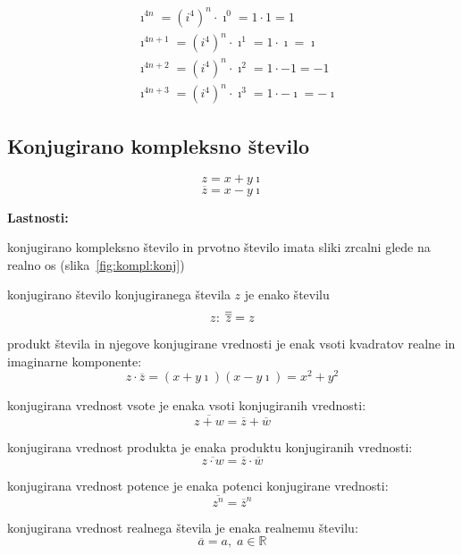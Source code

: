 \documentclass[a4paper,oneside,12pt,fleqn]{article}
\def\R{\ensuremath{\mathbb R}}
\newcommand\krat\cdot
\newcommand{\ii}{\ensuremath{\imath}}
\def\konj{\overline} %
\numberwithin{equation}{section}
\newenvironment{itemize*}%
{
\vspace{-12pt}%
\begin{itemize}%
\setlength{\itemsep}{0pt}%
\setlength{\parskip}{2pt}}%
{\end{itemize}}
\begin{document}
\begin{align*}
  &\ii^{4n} = (i^4)^n \krat \ii^0 = 1 \krat 1 = 1 \\
  &\ii^{4n+1} = (i^4)^n \krat \ii^1 = 1 \krat \ii = \ii \\
  &\ii^{4n+2} = (i^4)^n \krat \ii^2 = 1 \krat -1 = -1 \\
  &\ii^{4n+3} = (i^4)^n \krat \ii^3 = 1 \krat -\ii = -\ii
\end{align*}

\subsection{Konjugirano kompleksno število}
\[ z = x+y\ii \]
\[ \konj{z} = x-y\ii \]

\textbf{Lastnosti:}
\begin{itemize*}
  \item konjugirano kompleksno število in prvotno število imata sliki zrcalni glede na
    realno os (slika~\ref{fig:kompl:konj})
  \item konjugirano število konjugiranega števila $z$ je enako številu \[ z$:
    $\konj{\konj{z}} = z \]
  \item produkt števila in njegove konjugirane vrednosti je enak vsoti kvadratov realne in
    imaginarne komponente: \begin{equation} z\krat \konj{z} = (x+y\ii)(x-y\ii) = x^2+y^2 \label{eq:kompl:zzkonj} \end{equation}
  \item konjugirana vrednost vsote je enaka vsoti konjugiranih vrednosti:
    \begin{equation}
      \konj{z+w} = \konj{z} + \konj{w}
      \label{eq:kompl:konj:plus}
    \end{equation}
  \item konjugirana vrednost produkta je enaka produktu konjugiranih vrednosti:
    \begin{equation}
      \konj{z\krat w} = \konj{z} \krat \konj{w}
      \label{eq:kompl:konj:krat}
    \end{equation}
  \item konjugirana vrednost potence je enaka potenci konjugirane vrednosti:
    \begin{equation}
      \konj{z^n} = \konj{z}^n
      \label{eq:kompl:konj:pot}
    \end{equation}
  \item konjugirana vrednost realnega števila je enaka realnemu številu:
    \begin{equation}
      \konj{a} = a, \; a \in \R
      \label{eq:kompl:konj:konst}
    \end{equation}
\end{itemize*}
\end{document}
